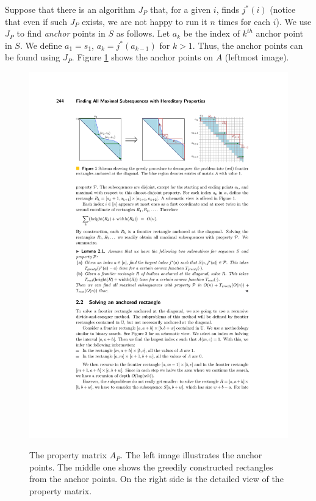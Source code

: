 \documentclass{article}
\begin{document}
Suppose that there is an algorithm $J_P$ that, for a given $i$, finds $j^*(i)$ (notice that even if such $J_P$ exists, we are not happy to run it $n$ times for each $i$). We use $J_P$ to find \textit{anchor} points in $S$ as follows. Let $a_k$ be the index of $k^{th}$ anchor point in $S$. We define $a_1 = s_1$, $a_k = j^*(a_{k-1})$ for $k > 1$. Thus, the anchor points can be found using $J_P$. Figure \ref{fig:property_matrix} shows the anchor points on $A$ (leftmost image).

\begin{figure}
    \centering
    \includegraphics[width=1.2\textwidth]{figures/property_matrix.pdf}
    \label{fig:property_matrix}
    \caption{The property matrix $A_P$. The left image illustrates the anchor points. The middle one shows the greedily constructed rectangles from the anchor points. On the right side is the detailed view of the property matrix.}
\end{figure}
\end{document}
